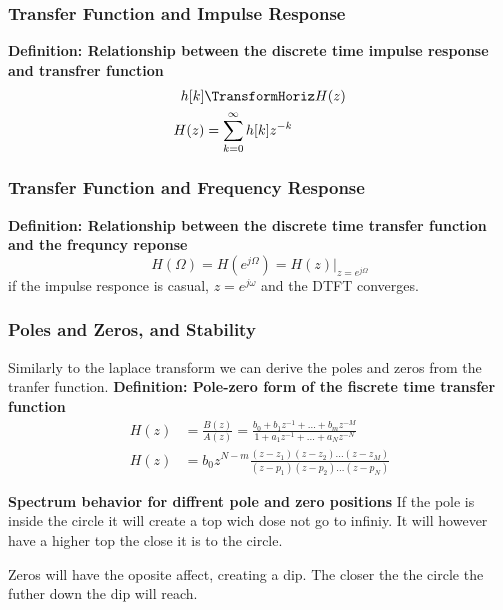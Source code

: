\subsubsection{Transfer Function and Impulse Response}
\textbf{Definition: Relationship between the discrete time impulse response and transfrer function}
\begin{align*}
    h[k] &\TransformHoriz H(z) \\
    H(z) &= \sum_{k=0}^{\infty} h[k]z^{-k} \\
\end{align*}

\subsubsection{Transfer Function and Frequency Response}
\textbf{Definition: Relationship between the discrete time transfer function and the frequncy reponse}
\begin{equation*}
    H(\Omega)=H(e^{j\Omega}) = H(z)|_{z=e^{j\Omega}}
\end{equation*}
if the impulse responce is casual, $z=e^{j\omega}$ and the DTFT converges.

\subsubsection{Poles and Zeros, and Stability}
Similarly to the laplace transform we can derive the poles and zeros from the tranfer function.
\textbf{Definition: Pole-zero form of the fiscrete time transfer function}
\begin{align*}
    H(z) &= \frac{B(z)}{A(z)} = \frac{b_0+b_1z^{-1}+\ldots+b_mz^{-M}}{1+a_1z^{-1}+\ldots+a_Nz^{-N}} \\
    H(z) &= b_0z^{N-m}\frac{(z-z_1)(z-z_2)\ldots(z-z_M)}{(z-p_1)(z-p_2)\ldots(z-p_N)}
\end{align*}

\textbf{Spectrum behavior for diffrent pole and zero positions}
If the pole is inside the circle it will create a top wich dose not go to 
infiniy. It will however have a higher top the close it is to the circle.

Zeros will have the oposite affect, creating a dip. The closer the the
circle the futher down the dip will reach.

